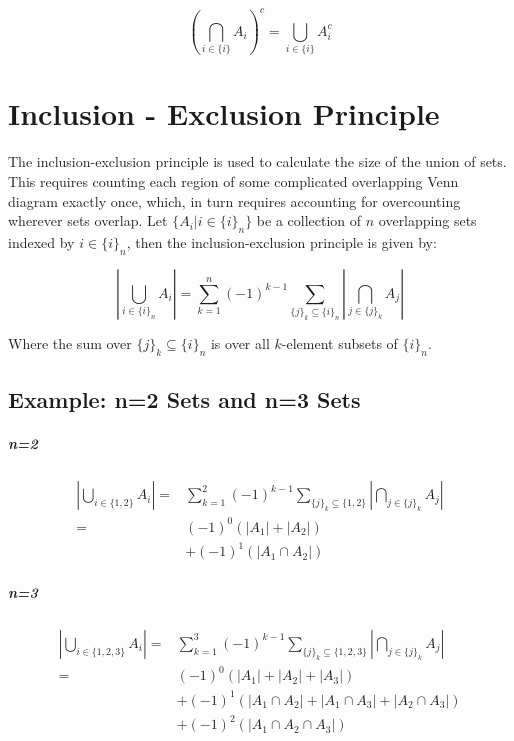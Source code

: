 \begin{equation}
\left(\bigcap_{i\in\{i\}}A_i\right)^c = \bigcup_{i\in\{i\}}A^c_i
\end{equation}


\section{Inclusion - Exclusion Principle}
\label{sec:inclusionexclusion}

The inclusion-exclusion principle is used to calculate the size of the union of sets. This requires counting each region of some complicated overlapping Venn diagram exactly once, which, in turn requires accounting for overcounting wherever sets overlap. Let $\{A_i | i\in \{i\}_n \}$ be a collection of $n$ overlapping sets indexed by $i\in \{i\}_n$, then the inclusion-exclusion principle is given by:

\begin{equation}
\left|\bigcup_{i\in\{i\}_n} A_i\right| = \sum^n_{k=1} (-1)^{k-1} \sum_{\{j\}_k \subseteq \{i\}_n} \left|\bigcap_{j\in\{j\}_k} A_j\right|
\end{equation}


Where the sum over $\{j\}_k \subseteq \{i\}_n$ is over all $k$-element subsets of $\{i\}_n$.

\subsection{Example: n=2 Sets and n=3 Sets}

\subparagraph{n=2}
\begin{equation}
\begin{array}{rl}
\left|\bigcup_{i\in\{1,2\}}A_i\right| =&  \sum^2_{k=1} (-1)^{k-1} \sum_{\{j\}_k \subseteq \{1,2\}} \left|\bigcap_{j\in\{j\}_k} A_j\right|\\
=&(-1)^{0}\left(|A_1| + |A_2|\right) \\
&+ (-1)^{1}\left(|A_1 \cap A_2| \right)
\end{array}
\end{equation}


\subparagraph{n=3}
\begin{equation}
\begin{array}{rl}
\left|\bigcup_{i\in\{1,2,3\}}A_i\right| =&  \sum^3_{k=1} (-1)^{k-1} \sum_{\{j\}_k \subseteq \{1,2,3\}} \left|\bigcap_{j\in\{j\}_k} A_j\right|\\
=&(-1)^{0}\left(|A_1| + |A_2| + |A_3|\right) \\
&+ (-1)^{1}\left(|A_1 \cap A_2|  + |A_1 \cap A_3| + |A_2 \cap A_3|  \right) \\ 
&+ (-1)^{2}\left(|A_1 \cap A_2 \cap A_3|   \right)
\end{array}
\end{equation}


